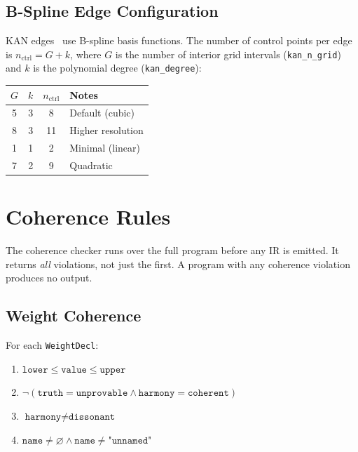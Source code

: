 \documentclass[11pt,a4paper]{article}
\begin{document}
\subsection{B-Spline Edge Configuration}

KAN edges~\cite{liu2024kan} use B-spline basis functions. The number of control points per
edge is $n_\text{ctrl} = G + k$, where $G$ is the number of interior grid intervals
(\texttt{kan\_n\_grid}) and $k$ is the polynomial degree (\texttt{kan\_degree}):

\begin{center}
\begin{tabular}{cccl}
\toprule
$G$ & $k$ & $n_\text{ctrl}$ & Notes \\
\midrule
5 & 3 & 8  & Default (cubic) \\
8 & 3 & 11 & Higher resolution \\
1 & 1 & 2  & Minimal (linear) \\
7 & 2 & 9  & Quadratic \\
\bottomrule
\end{tabular}
\end{center}

\section{Coherence Rules}
\label{sec:coherence}

The coherence checker runs over the full program before any IR is emitted.
It returns \emph{all} violations, not just the first. A program with any coherence
violation produces no output.

\subsection{Weight Coherence}

For each \texttt{WeightDecl}:

\begin{enumerate}
  \item $\texttt{lower} \leq \texttt{value} \leq \texttt{upper}$
  \item $\neg(\texttt{truth} = \texttt{unprovable} \wedge \texttt{harmony} = \texttt{coherent})$
  \item $\texttt{harmony} \neq \texttt{dissonant}$
  \item $\texttt{name} \neq \varnothing \wedge \texttt{name} \neq \texttt{"unnamed"}$
\end{enumerate}
\end{document}
